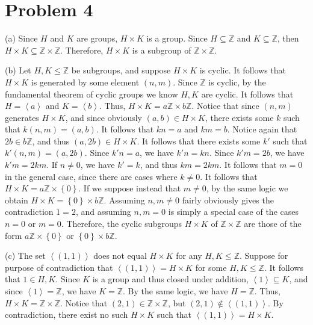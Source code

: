 \documentclass[11pt, letterpaper]{report}
\begin{document}
\section*{Problem 4}
\begin{solution}
	(a) Since $H$ and $K$ are groups, $H\times K$ is a group. Since $H\subseteq \mathbb{Z}$ and $K\subseteq \mathbb{Z}$, then $H\times K\subseteq \mathbb{Z}\times \mathbb{Z}$. Therefore, $H\times K$ is a subgroup of $\mathbb{Z}\times \mathbb{Z}$.

	(b) Let $H,K\leq \mathbb{Z}$ be subgroups, and suppose $H\times K$ is cyclic. It follows that $H\times K$ is generated by some element $(n,m)$. Since $\mathbb{Z}$ is cyclic, by the fundamental theorem of cyclic groups we know $H,K$ are cyclic. It follows that $H =\left<a \right>$ and $K=\left<b \right>$. Thus, $H\times K=a\mathbb{Z}\times b\mathbb{Z}$. Notice that since $(n,m)$ generates $H\times K$, and since obviously $(a,b)\in H\times K$, there exists some $k$ such that $k(n,m)=(a,b)$. It follows that $kn=a$ and $km=b$. Notice again that $2b\in b\mathbb{Z}$, and thus $(a,2b)\in H\times K$. It follows that there exists some $k'$ such that $k'(n,m)=(a,2b)$. Since $k'n=a$, we have $k'n=kn$. Since $k'm=2b$, we have $k'm=2km$. If $n\neq 0$, we have $k'=k$, and thus $km=2km$. It follows that $m=0$ in the general case, since there are cases where $k\neq 0$. It follows that $H\times K=a\mathbb{Z}\times \left\{ 0 \right\} $. If we suppose instead that $m\neq 0$, by the same logic we obtain $H\times K=\left\{ 0 \right\} \times b\mathbb{Z}$. Assuming $n,m\neq 0$ fairly obviously gives the contradiction $1=2$, and assuming $n,m=0$ is simply a special case of the cases $n=0$ or $m=0$. Therefore, the cyclic subgroups $H\times K$ of $\mathbb{Z}\times \mathbb{Z}$ are those of the form $a\mathbb{Z}\times \left\{ 0 \right\} $ or $\left\{ 0 \right\} \times b\mathbb{Z}$.

	(c) The set $\left<(1,1) \right>$ does not equal $H\times K$ for any $H,K\leq \mathbb{Z}$. Suppose for purpose of contradiction that $\left<(1,1) \right> = H\times K$ for some $H,K\leq \mathbb{Z}$. It follows that $1\in H,K$. Since $K$ is a group and thus closed under addition, $\left<1 \right>\subseteq K$, and since $\left<1 \right> =\mathbb{Z}$, we have $K=\mathbb{Z}$. By the same logic, we have $H=\mathbb{Z}$. Thus, $H\times K=\mathbb{Z}\times \mathbb{Z}$. Notice that $(2,1)\in\mathbb{Z}\times \mathbb{Z}$, but $(2,1)\notin \left<(1,1) \right>$. By contradiction, there exist no such $H\times K$ such that $\left<(1,1) \right> =H\times K$.
\end{solution}
\end{document}
